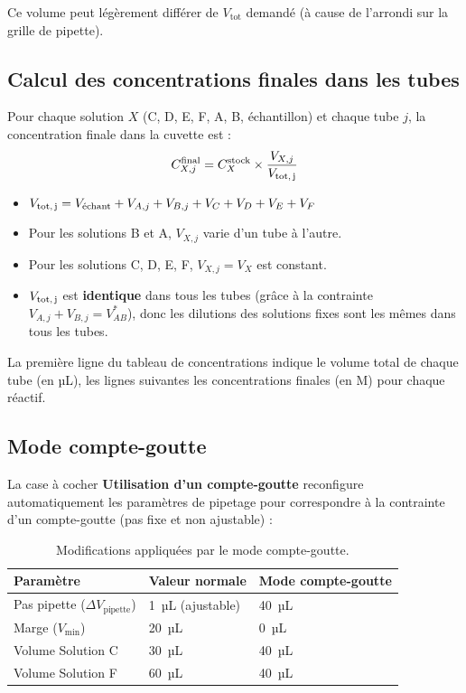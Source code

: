 \documentclass[12pt, a4paper]{article}
\begin{document}
Ce volume peut légèrement différer de $V_\text{tot}$ demandé (à cause de
l'arrondi sur la grille de pipette).

\subsection{Calcul des concentrations finales dans les tubes}

Pour chaque solution $X$ (C, D, E, F, A, B, échantillon) et chaque tube $j$,
la concentration finale dans la cuvette est :
\[
C_{X,j}^\text{final} = C_X^\text{stock} \times \frac{V_{X,j}}{V_\text{tot,\,j}}
\]

\begin{itemize}
  \item $V_\text{tot,\,j} = V_\text{échant} + V_{A,j} + V_{B,j} + V_C + V_D + V_E + V_F$
  \item Pour les solutions B et A, $V_{X,j}$ varie d'un tube à l'autre.
  \item Pour les solutions C, D, E, F, $V_{X,j} = V_X$ est constant.
  \item $V_\text{tot,\,j}$ est \textbf{identique} dans tous les tubes (grâce
        à la contrainte $V_{A,j} + V_{B,j} = V_{AB}^*$), donc les dilutions
        des solutions fixes sont les mêmes dans tous les tubes.
\end{itemize}

La première ligne du tableau de concentrations indique le volume total de
chaque tube (en µL), les lignes suivantes les concentrations finales (en M)
pour chaque réactif.

\subsection{Mode compte-goutte}

La case à cocher \textbf{Utilisation d'un compte-goutte} reconfigure
automatiquement les paramètres de pipetage pour correspondre à la contrainte
d'un compte-goutte (pas fixe et non ajustable) :

\begin{table}[h!]
  \centering
  \caption{Modifications appliquées par le mode compte-goutte.}
  \label{tab:dropper}
  \begin{tabular}{lll}
    \toprule
    \textbf{Paramètre} & \textbf{Valeur normale} & \textbf{Mode compte-goutte} \\
    \midrule
    Pas pipette ($\Delta V_\text{pipette}$) & 1~µL (ajustable) & 40~µL \\
    Marge ($V_\text{min}$)                 & 20~µL            & 0~µL  \\
    Volume Solution C                      & 30~µL            & 40~µL \\
    Volume Solution F                      & 60~µL            & 40~µL \\
    \bottomrule
  \end{tabular}
\end{table}
\end{document}
